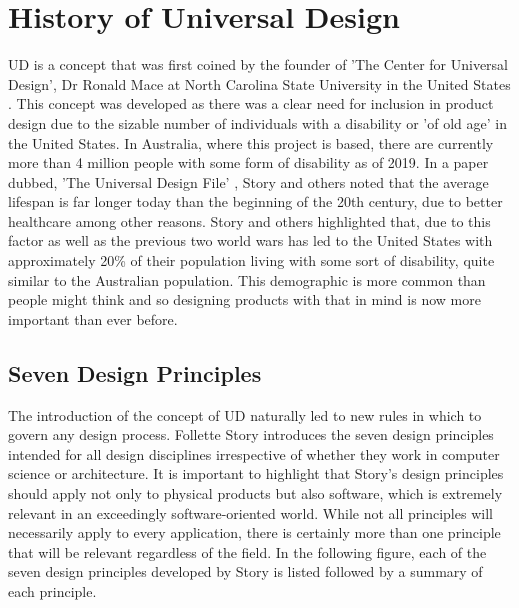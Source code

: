 \section{History of Universal Design}
UD is a concept that was first coined by the founder of 'The Center for Universal Design', Dr Ronald Mace at North Carolina State University in the United States \cite{ronald}.
This concept was developed as there was a clear need for inclusion in product design due to the sizable number of individuals with a disability or 'of old age' in the United States.
In Australia, where this project is based, there are currently more than 4 million people with some form of disability \cite{ausstats} as of 2019. 
In a paper dubbed, 'The Universal Design File' \cite{universalfile}, Story and others noted that the average lifespan is far longer today than the beginning of the 20th century, due to better healthcare among other reasons.
Story and others highlighted that, due to this factor as well as the previous two world wars has led to the United States with approximately 20\% of their population living with some sort of disability, quite similar to the Australian population.
This demographic is more common than people might think and so designing products with that in mind is now more important than ever before.

\subsection{Seven Design Principles}

The introduction of the concept of UD naturally led to new rules in which to govern any design process. %
Follette Story introduces the seven design principles \cite{sevenprinciples} intended for all design disciplines irrespective of whether they work in computer science or architecture.
It is important to highlight that Story's design principles should apply not only to physical products but also software, which is extremely relevant in an exceedingly software-oriented world.
While not all principles will necessarily apply to every application, there is certainly more than one principle that will be relevant regardless of the field.
In the following figure, each of the seven design principles developed by Story is listed followed by a summary of each principle.

